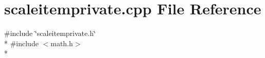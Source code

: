 \section{scaleitemprivate.\+cpp File Reference}
\label{axes_2scaleitemprivate_8cpp}
{\ttfamily \#include \char`\"{}scaleitemprivate.\+h\char`\"{}}\\*
{\ttfamily \#include $<$math.\+h$>$}\\*
